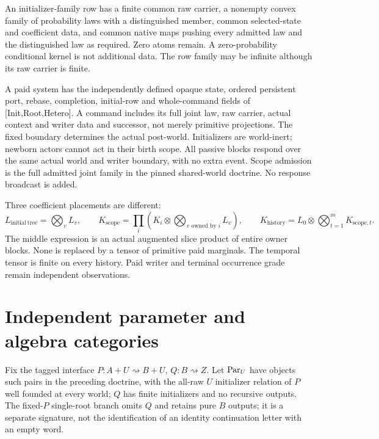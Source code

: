 \documentclass[11pt]{article}
\begin{document}
An initializer-family row has a finite common raw carrier, a nonempty convex family of probability laws with a distinguished member, common selected-state and coefficient data, and common native maps pushing every admitted law and the distinguished law as required. Zero atoms remain. A zero-probability conditional kernel is not additional data. The row family may be infinite although its raw carrier is finite.

A paid system has the independently defined opaque state, ordered persistent port, rebase, completion, initial-row and whole-command fields of [Init,Root,Hetero]. A command includes its full joint law, raw carrier, actual context and writer data and successor, not merely primitive projections. The fixed boundary determines the actual post-world. Initializers are world-inert; newborn actors cannot act in their birth scope. All passive blocks respond over the same actual world and writer boundary, with no extra event. Scope admission is the full admitted joint family in the pinned shared-world doctrine. No response broadcast is added.

Three coefficient placements are different:
\[
 L_{\mathrm{initial\ tree}}=\bigotimes_vL_v,\qquad
 K_{\mathrm{scope}}=\prod_i\left(K_i\otimes\bigotimes_{v\text{ owned by }i}L_v\right),
 \qquad K_{\mathrm{history}}=L_0\otimes\bigotimes_{t=1}^m K_{\mathrm{scope},t}.
\]
The middle expression is an actual augmented slice product of entire owner blocks. None is replaced by a tensor of primitive paid marginals. The temporal tensor is finite on every history. Paid writer and terminal occurrence grade remain independent observations.

\section{Independent parameter and algebra categories}
Fix the tagged interface $P:A+U\rightsquigarrow B+U$, $Q:B\rightsquigarrow Z$. Let $\operatorname{Par}_U$ have objects such pairs in the preceding doctrine, with the all-raw $U$ initializer relation of $P$ well founded at every world; $Q$ has finite initializers and no recursive outputs. The fixed-$P$ single-root branch omits $Q$ and retains pure $B$ outputs; it is a separate signature, not the identification of an identity continuation letter with an empty word.
\end{document}
